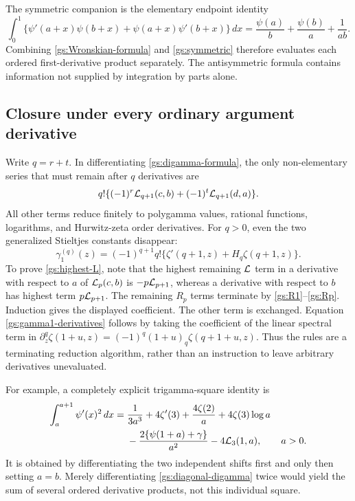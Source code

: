 The symmetric companion is the elementary endpoint identity
\begin{equation}\label{gs:symmetric}
 \int_0^1
 \{\psi'(a+x)\psi(b+x)+\psi(a+x)\psi'(b+x)\}\,dx
 =\frac{\psi(a)}b+\frac{\psi(b)}a+\frac1{ab}.
\end{equation}
Combining \eqref{gs:Wronskian-formula} and \eqref{gs:symmetric}
therefore evaluates each ordered first-derivative product separately.
The antisymmetric formula contains information not supplied by
integration by parts alone.

\subsection{Closure under every ordinary argument derivative}

Write $q=r+t$.  In differentiating \eqref{gs:digamma-formula}, the
only non-elementary series that must remain after $q$ derivatives are
\begin{equation}\label{gs:highest-L}
 q!\{(-1)^r\mathcal L_{q+1}(c,b)+(-1)^t\mathcal L_{q+1}(d,a)\}.
\end{equation}
All other terms reduce finitely to polygamma values, rational
functions, logarithms, and Hurwitz-zeta order derivatives.  For
$q>0$, even the two generalized Stieltjes constants disappear:
\begin{equation}\label{gs:gamma1-derivatives}
 \gamma_1^{(q)}(z)=(-1)^{q+1}q!
        \{\zeta'(q+1,z)+H_q\zeta(q+1,z)\}.
\end{equation}
To prove \eqref{gs:highest-L}, note that the highest remaining
$\mathcal L$ term in a derivative with respect to $a$ of $\mathcal L_p(c,b)$
is $-p\mathcal L_{p+1}$, whereas a derivative with respect to $b$ has
highest term $p\mathcal L_{p+1}$.  The remaining $R_p$ terms terminate
by \eqref{gs:R1}--\eqref{gs:Rp}.  Induction gives the displayed
coefficient.  The other term is exchanged.  Equation
\eqref{gs:gamma1-derivatives} follows by taking the coefficient of
the linear spectral term in
$\partial_z^q\zeta(1+u,z)=(-1)^q(1+u)_q\zeta(q+1+u,z)$.
Thus the rules are a terminating reduction algorithm, rather than an
instruction to leave arbitrary derivatives unevaluated.

For example, a completely explicit trigamma-square identity is
\begin{align}
 \int_a^{a+1}\psi'(x)^2\,dx
 ={}&\frac1{3a^3}+4\zeta'(3)+\frac{4\zeta(2)}a
        +4\zeta(3)\log a\notag\\
 &-\frac{2\{\psi(1+a)+\gamma\}}{a^2}
        -4\mathcal L_3(1,a),\qquad a>0.
 \label{gs:trigamma-square}
\end{align}
It is obtained by differentiating the two independent shifts first
and only then setting $a=b$.  Merely differentiating
\eqref{gs:diagonal-digamma} twice would yield the sum of several
ordered derivative products, not this individual square.


